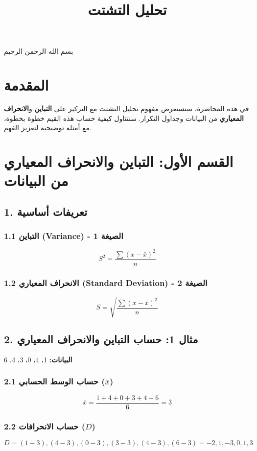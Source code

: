 \documentclass{article}
\title{تحليل التشتت}
\begin{document}
\maketitle

بسم الله الرحمن الرحيم

\section{المقدمة}

في هذه المحاضرة، سنستعرض مفهوم تحليل التشتت مع التركيز على \textbf{التباين} و\textbf{الانحراف المعياري} من البيانات وجداول التكرار. سنتناول كيفية حساب هذه القيم خطوة بخطوة، مع أمثلة توضيحية لتعزيز الفهم.

\section{القسم الأول: التباين والانحراف المعياري من البيانات}

\subsection{1. تعريفات أساسية}

\subsubsection{1.1 التباين (Variance) - \textbf{الصيغة 1}}
$$
S^2 = \frac{∑(x - \bar{x})^2}{n}
$$

\subsubsection{1.2 الانحراف المعياري (Standard Deviation) - \textbf{الصيغة 2}}
$$
S = \sqrt{\frac{∑(x - \bar{x})^2}{n}}
$$

\subsection{2. مثال 1: حساب التباين والانحراف المعياري}

\textbf{البيانات:} 1، 4، 0، 3، 4، 6

\subsubsection{2.1 حساب الوسط الحسابي ($\bar{x}$)}
$$
\bar{x} = \frac{1 + 4 + 0 + 3 + 4 + 6}{6} = 3
$$

\subsubsection{2.2 حساب الانحرافات ($D$)}
$$
D = (1 - 3), (4 - 3), (0 - 3), (3 - 3), (4 - 3), (6 - 3) = -2, 1, -3, 0, 1, 3
$$
\end{document}

